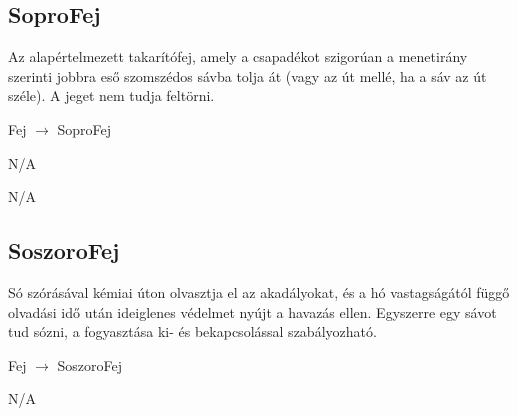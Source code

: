 \subsection{SoproFej}
\begin{class-template-responsibility}
    Az alapértelmezett takarítófej, amely a csapadékot szigorúan a menetirány szerinti jobbra eső szomszédos sávba tolja át (vagy az út mellé, ha a sáv az út széle). A jeget nem tudja feltörni.
\end{class-template-responsibility}
\begin{class-template-baseclass}
    Fej $\rightarrow$ SoproFej
\end{class-template-baseclass}
\begin{class-template-interface}
    N/A
\end{class-template-interface}
\begin{class-template-attribute}
    N/A
\end{class-template-attribute}
\begin{class-template-method}
\end{class-template-method}

\subsection{SoszoroFej}
\begin{class-template-responsibility}
   Só szórásával kémiai úton olvasztja el az akadályokat, és a hó vastagságától függő olvadási idő után ideiglenes védelmet nyújt a havazás ellen. Egyszerre egy sávot tud sózni, a fogyasztása ki- és bekapcsolással szabályozható.
\end{class-template-responsibility}
\begin{class-template-baseclass}
    Fej $\rightarrow$ SoszoroFej
\end{class-template-baseclass}
\begin{class-template-interface}
    N/A
\end{class-template-interface}
\begin{class-template-attribute}
\end{class-template-attribute}
\begin{class-template-method}
\end{class-template-method}

